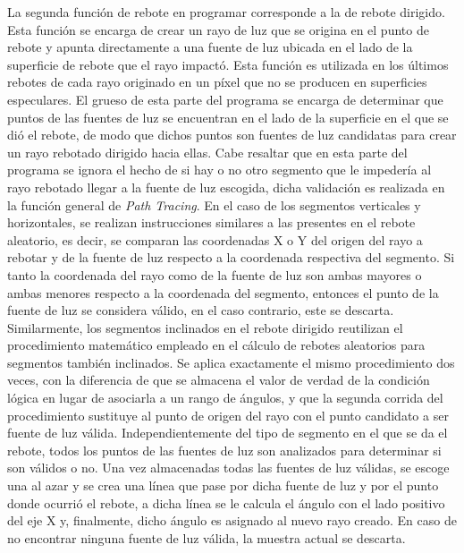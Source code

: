 \documentclass[conference]{IEEEtran}
\begin{document}
La segunda función de rebote en programar corresponde a la de rebote dirigido. Esta función se encarga de crear un rayo de luz que se origina en el punto de rebote y apunta directamente a una fuente de luz ubicada en el lado de la superficie de rebote que el rayo impactó. Esta función es utilizada en los últimos rebotes de cada rayo originado en un píxel que no se producen en superficies especulares. El grueso de esta parte del programa se encarga de determinar que puntos de las fuentes de luz se encuentran en el lado de la superficie en el que se dió el rebote, de modo que dichos puntos son fuentes de luz candidatas para crear un rayo rebotado dirigido hacia ellas. Cabe resaltar que en esta parte del programa se ignora el hecho de si hay o no otro segmento que le impedería al rayo rebotado llegar a la fuente de luz escogida, dicha validación es realizada en la función general de \textit{Path Tracing}. En el caso de los segmentos verticales y horizontales, se realizan instrucciones similares a las presentes en el rebote aleatorio, es decir, se comparan las coordenadas X o Y del origen del rayo a rebotar y de la fuente de luz respecto a la coordenada respectiva del segmento. Si tanto la coordenada del rayo como de la fuente de luz son ambas mayores o ambas menores respecto a la coordenada del segmento, entonces el punto de la fuente de luz se considera válido, en el caso contrario, este se descarta. Similarmente, los segmentos inclinados en el rebote dirigido reutilizan el procedimiento matemático empleado en el cálculo de rebotes aleatorios para segmentos también inclinados. Se aplica exactamente el mismo procedimiento dos veces, con la diferencia de que se almacena el valor de verdad de la condición lógica en lugar de asociarla a un rango de ángulos, y que la segunda corrida del procedimiento sustituye al punto de origen del rayo con el punto candidato a ser fuente de luz válida. Independientemente del tipo de segmento en el que se da el rebote, todos los puntos de las fuentes de luz son analizados para determinar si son válidos o no. Una vez almacenadas todas las fuentes de luz válidas, se escoge una al azar y se crea una línea que pase por dicha fuente de luz y por el punto donde ocurrió el rebote, a dicha línea se le calcula el ángulo con el lado positivo del eje X y, finalmente, dicho ángulo es asignado al nuevo rayo creado. En caso de no encontrar ninguna fuente de luz válida, la muestra actual se descarta.
\end{document}
